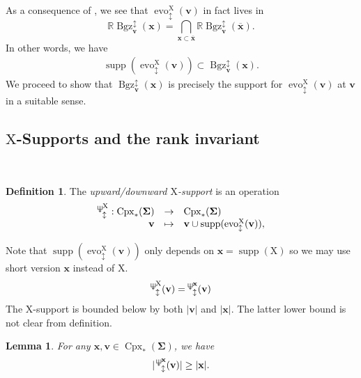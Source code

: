 \documentclass[11pt,reqno]{amsart}
\newcommand{\Neptune}{\mathord{\text{\tikz[baseline=-.5ex,scale=.13]{\draw[line width=.45pt] (0,0)--(0,1.8) (-.6,1.8)--(-.6,.8)--(.6,.8)--(.6,1.8) (-.35,.35)--(.35,.35);}}}}
\theoremstyle{plain}
\newtheorem{lemma}[theorem]{Lemma}
\theoremstyle{definition}
\newtheorem{definition}[theorem]{Definition}
\newtheorem{remark}[theorem]{Remark}
\numberwithin{equation}{section}
\newcommand\RR{\mathbb{R}}
\newcommand\<{\langle}
\renewcommand\>{\rangle}
\newcommand{\on}[1]{\operatorname{#1}}
\def\CCx{\on{Cpx}}   %
\def\vv{\mathbf{v}}
\def\sink{X}
\newcommand{\flowdu}[1]{\on{evo}_{\updownarrow}^{#1}}
\newcommand{\flowDU}[1]{\on{Evo}_{\updownarrow}^{#1}}
\newcommand{\ccpt}[1]{\mathrm{#1}}%
\def\xevo{\ccpt{X}}%
\def\seeds{\mathbf{\Sigma}}
\def\xx{\mathbf{x}}%
\def\supp{\on{supp}}
\newcommand{\Bgzpm}[2]{\operatorname{Bgz}^{\updownarrow}_{#2}(#1)}
\newcommand{\suppdu}[1]{\operatorname{\Neptune}_{\updownarrow}^{#1}}
\newcommand{\ol}[1]{\overline{#1}}
\begin{document}
As a consequence of , we see that $\flowdu{\xevo}(\vv)$ in fact lives in
\[
    \RR\Bgzpm{\xx}{\vv}=\bigcap_{\xx\subset\ol{\xx}}\RR\Bgzpm{\ol{\xx}}{\vv}.
\]
In other words, we have
\begin{gather}\label{eq:suppevo}
    \supp(\flowdu{\xevo}(\vv))\subset\Bgzpm{\xx}{\vv}.
\end{gather}
We proceed to show that $\Bgzpm{\xx}{\vv}$ is precisely the support for $\flowdu{\xevo}(\vv)$ at $\vv$
in a suitable sense.




\subsection{$\xevo$-Supports and the rank invariant}\label{sec:Xsupp}\


\begin{definition}\label{def:Xsupp}
The \emph{upward/downward $\xevo$-support} is an operation
\begin{equation}\label{eq:Xsupp-V}
\begin{array}{rcl}
\suppdu{\xevo}:\CCx_*(\seeds) &\to    &\CCx_*(\seeds)\\
\vv                           &\mapsto&\vv\cup\supp(\flowdu{\xevo}(\vv)),
\end{array}
\end{equation}
\end{definition}

Note that $\supp(\flowdu{\xevo}(\vv))$ only depends on $\xx=\supp(\xevo)$ so we may use short version $\xx$ instead of $\xevo$. %
\begin{gather}\label{eq:simplified}
    \suppdu{\xevo}(\vv)=\suppdu{\xx}(\vv)
\end{gather}
The $\xevo$-support is bounded below by both $|\vv|$ and $|\xx|$.
The latter lower bound is not clear from definition.
\begin{lemma}\label{lem:bbelow-xx}
    For any $\xx,\vv\in\CCx_*(\seeds)$, we have
    \begin{gather}\label{eq:bbelow-xx}
        |\suppdu{\xx}(\vv)|\ge|\xx|.
    \end{gather}
\end{lemma}
\end{document}
